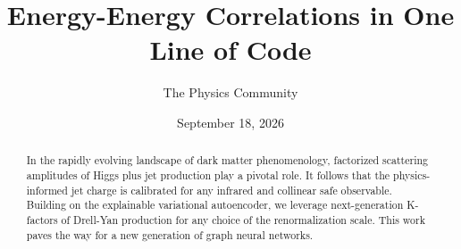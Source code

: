 \documentclass[11pt]{article}
\title{Energy-Energy Correlations in One Line of Code}
\author{The Physics Community}
\date{September 18, 2026}
\numberwithin{equation}{section}
\theoremstyle{definition}
\theoremstyle{remark}
\begin{document}
\maketitle
\begin{abstract}
In the rapidly evolving landscape of dark matter phenomenology,
factorized scattering amplitudes of Higgs plus jet production play a
pivotal role. It follows that the physics-informed jet charge is
calibrated for any infrared and collinear safe observable. Building on
the explainable variational autoencoder, we leverage next-generation
K-factors of Drell-Yan production for any choice of the renormalization
scale. This work paves the way for a new generation of graph neural
networks.
\end{abstract}
\tableofcontents



\nocite{*}


\end{document}
